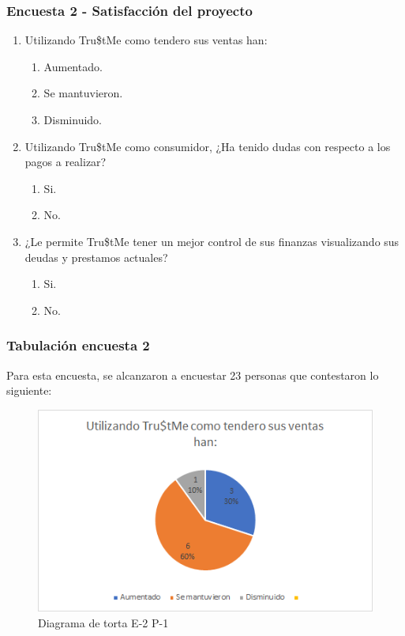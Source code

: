 {		\subsubsection*{Encuesta 2 - Satisfacción del proyecto}
		
			\begin{enumerate}
				
				\item Utilizando Tru\$tMe como tendero sus ventas han:
				
				\begin{enumerate}
					\item Aumentado.
					\item Se mantuvieron.
					\item Disminuido.
				\end{enumerate}
				
				\item Utilizando Tru\$tMe como consumidor, ¿Ha tenido dudas con respecto a los pagos a realizar?
				
				\begin{enumerate}
					\item Si.
					\item No.
				\end{enumerate}	
				
				\item ¿Le permite Tru\$tMe tener un mejor control de sus finanzas visualizando sus deudas y prestamos actuales?
				
				\begin{enumerate}
					\item Si.
					\item No.
				\end{enumerate}
				
			\end{enumerate}
		
		\subsubsection*{Tabulación encuesta 2}
		
		{Para esta encuesta, se alcanzaron a encuestar 23 personas que contestaron lo siguiente:
			
			\begin{figure}[H]
				\centering
				\includegraphics[width=0.8\linewidth]{annexes/e2-p1.png}
				\caption{Diagrama de torta E-2 P-1}
			\end{figure}
			
}}
